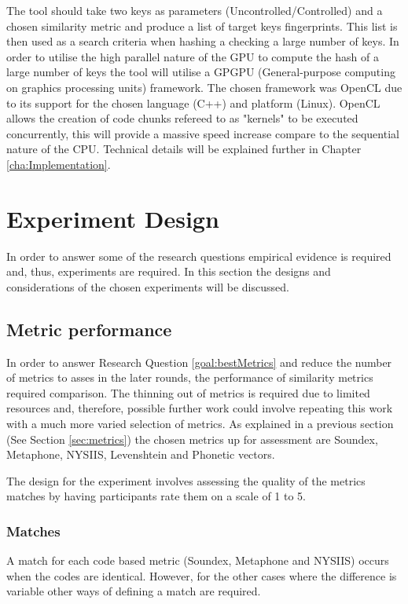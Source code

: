 The tool should take two keys as parameters (Uncontrolled/Controlled) and a chosen similarity metric and produce a list of target keys fingerprints. This list is then used as a search criteria when hashing a checking a large number of keys. In order to utilise the high parallel nature of the GPU to compute the hash of a large number of keys the tool will utilise a GPGPU (General-purpose computing on graphics processing units) framework. The chosen framework was OpenCL due to its support for the chosen language (C++) and platform (Linux). OpenCL allows the creation of code chunks refereed to as "kernels" to be executed concurrently, this will provide a massive speed increase compare to the sequential nature of the CPU. Technical details will be explained further in Chapter \ref{cha:Implementation}.

\section{Experiment Design}
In order to answer some of the research questions empirical evidence is required and, thus, experiments are required. In this section the designs and considerations of the chosen experiments will be discussed.

\subsection{Metric performance}
\label{exp:metric}
In order to answer Research Question \ref{goal:bestMetrics} and reduce the number of metrics to asses in the later rounds, the performance of similarity metrics required comparison. The thinning out of metrics is required due to limited resources and, therefore, possible further work could involve repeating this work with a much more varied selection of metrics. As explained in a previous section (See Section \ref{sec:metrics}) the chosen metrics up for assessment are Soundex, Metaphone, NYSIIS, Levenshtein and Phonetic vectors.

The design for the experiment involves assessing the quality of the metrics matches by having participants rate them on a scale of 1 to 5.

\subsubsection{Matches}
A match for each code based metric (Soundex, Metaphone and NYSIIS) occurs when the codes are identical. However, for the other cases where the difference is variable other ways of defining a match are required.

